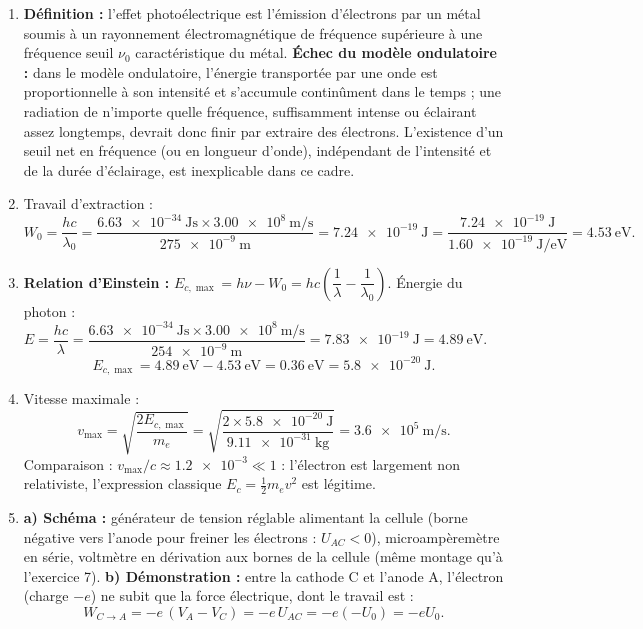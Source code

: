 \documentclass[11pt]{article}
\begin{document}
\begin{corrige}
\begin{enumerate}
\item \textbf{Définition :} l'effet photoélectrique est l'émission d'électrons par un métal soumis à un rayonnement électromagnétique de fréquence supérieure à une fréquence seuil $\nu_0$ caractéristique du métal.
\textbf{Échec du modèle ondulatoire :} dans le modèle ondulatoire, l'énergie transportée par une onde est proportionnelle à son intensité et s'accumule continûment dans le temps ; une radiation de n'importe quelle fréquence, suffisamment intense ou éclairant assez longtemps, devrait donc finir par extraire des électrons. L'existence d'un seuil net en fréquence (ou en longueur d'onde), indépendant de l'intensité et de la durée d'éclairage, est inexplicable dans ce cadre.
\item Travail d'extraction :
\[ W_0 = \frac{hc}{\lambda_0} = \frac{\SI{6,63e-34}{\joule\second}\times\SI{3,00e8}{\meter\per\second}}{\SI{275e-9}{\meter}} = \SI{7,24e-19}{\joule} = \frac{\SI{7,24e-19}{\joule}}{\SI{1,60e-19}{\joule\per\electronvolt}} = \SI{4,53}{\electronvolt}. \]
\item \textbf{Relation d'Einstein :} $E_{c,\max} = h\nu - W_0 = hc\left(\dfrac{1}{\lambda} - \dfrac{1}{\lambda_0}\right)$.
Énergie du photon : $E = \dfrac{hc}{\lambda} = \dfrac{\SI{6,63e-34}{\joule\second}\times\SI{3,00e8}{\meter\per\second}}{\SI{254e-9}{\meter}} = \SI{7,83e-19}{\joule} = \SI{4,89}{\electronvolt}$.
\[ E_{c,\max} = \SI{4,89}{\electronvolt} - \SI{4,53}{\electronvolt} = \SI{0,36}{\electronvolt} = \SI{5,8e-20}{\joule}. \]
\item Vitesse maximale :
\[ v_{\max} = \sqrt{\frac{2E_{c,\max}}{m_e}} = \sqrt{\frac{2\times\SI{5,8e-20}{\joule}}{\SI{9,11e-31}{\kilogram}}} = \SI{3,6e5}{\meter\per\second}. \]
Comparaison : $v_{\max}/c \approx \num{1,2e-3} \ll 1$ : l'électron est largement non relativiste, l'expression classique $E_c = \frac{1}{2}m_ev^2$ est légitime.
\item \textbf{a) Schéma :} générateur de tension réglable alimentant la cellule (borne négative vers l'anode pour freiner les électrons : $U_{AC} < 0$), microampèremètre en série, voltmètre en dérivation aux bornes de la cellule (même montage qu'à l'exercice 7).
\textbf{b) Démonstration :} entre la cathode C et l'anode A, l'électron (charge $-e$) ne subit que la force électrique, dont le travail est :
\[ W_{C\to A} = -e\,(V_A - V_C) = -e\,U_{AC} = -e(-U_0) = -eU_0. \]

\end{enumerate}
\end{corrige}
\end{document}
